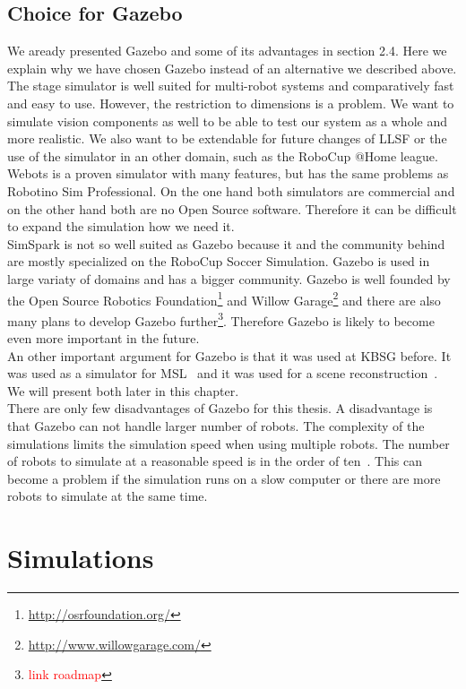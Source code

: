 \subsection{Choice for Gazebo}
We aready presented Gazebo and some of its advantages in section 2.4. Here we explain why we have chosen Gazebo instead of an alternative we described above.\\
The stage simulator is well suited for multi-robot systems and comparatively fast and easy to use. However, the restriction to dimensions is a problem. We want to simulate vision components as well to be able to test our system as a whole and more realistic. We also want to be extendable for future changes of LLSF or the use of the simulator in an other domain, such as the RoboCup @Home league.\\
Webots is a proven simulator with many features, but has the same problems as Robotino Sim Professional. On the one hand both simulators are commercial and on the other hand both are no Open Source software. Therefore it can be difficult to expand the simulation how we need it.\\
SimSpark is not so well suited as Gazebo because it and the community behind are mostly specialized on the RoboCup Soccer Simulation. Gazebo is used in large variaty of domains and has a bigger community. Gazebo is well founded by the Open Source Robotics Foundation\footnote{\url{http://osrfoundation.org/}} and Willow Garage\footnote{\url{http://www.willowgarage.com/}} and there are also many plans to develop Gazebo further\footnote{\textcolor{red}{link roadmap}}. Therefore Gazebo is likely to become even more important in the future.\\
An other important argument for Gazebo is that it was used at KBSG before. It was used as a simulator for MSL~\cite{MultiLevelAbstraction} and it was used for a scene reconstruction~\cite{KlingenDA}. We will present both later in this chapter.\\
There are only few disadvantages of Gazebo for this thesis. A disadvantage is that Gazebo can not handle larger number of robots. The complexity of the simulations limits the simulation speed when using multiple robots. The number of robots to simulate at a reasonable speed is in the order of ten~\cite{GazeboDesign}. This can become a problem if the simulation runs on a slow computer or there are more robots to simulate at the same time.

\section{Simulations}
